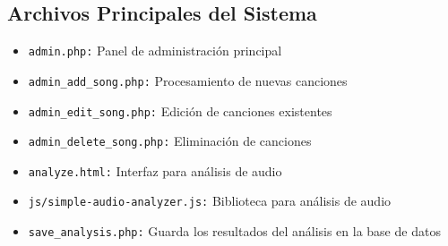 \documentclass[a4paper,12pt]{article}
\begin{document}
\subsection{Archivos Principales del Sistema}
\begin{itemize}
  \item \texttt{admin.php:} Panel de administración principal
  \item \texttt{admin\_add\_song.php:} Procesamiento de nuevas canciones
  \item \texttt{admin\_edit\_song.php:} Edición de canciones existentes
  \item \texttt{admin\_delete\_song.php:} Eliminación de canciones
  \item \texttt{analyze.html:} Interfaz para análisis de audio
  \item \texttt{js/simple-audio-analyzer.js:} Biblioteca para análisis de audio
  \item \texttt{save\_analysis.php:} Guarda los resultados del análisis en la base de datos
\end{itemize}
\end{document}
